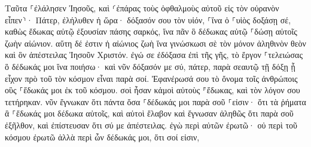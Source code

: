 \documentclass{openreader}
\begin{document}
Ταῦτα ⸀ἐλάλησεν Ἰησοῦς, καὶ ⸂ἐπάρας τοὺς ὀφθαλμοὺς αὐτοῦ εἰς τὸν οὐρανὸν εἶπεν⸃· Πάτερ, ἐλήλυθεν ἡ ὥρα· δόξασόν σου τὸν υἱόν, ⸀ἵνα ὁ ⸀υἱὸς δοξάσῃ σέ, 
καθὼς ἔδωκας αὐτῷ ἐξουσίαν πάσης σαρκός, ἵνα πᾶν ὃ δέδωκας αὐτῷ ⸀δώσῃ αὐτοῖς ζωὴν αἰώνιον. 
αὕτη δέ ἐστιν ἡ αἰώνιος ζωὴ ἵνα γινώσκωσι σὲ τὸν μόνον ἀληθινὸν θεὸν καὶ ὃν ἀπέστειλας Ἰησοῦν Χριστόν. 
ἐγώ σε ἐδόξασα ἐπὶ τῆς γῆς, τὸ ἔργον ⸀τελειώσας ὃ δέδωκάς μοι ἵνα ποιήσω· 
καὶ νῦν δόξασόν με σύ, πάτερ, παρὰ σεαυτῷ τῇ δόξῃ ᾗ εἶχον πρὸ τοῦ τὸν κόσμον εἶναι παρὰ σοί. 
Ἐφανέρωσά σου τὸ ὄνομα τοῖς ἀνθρώποις οὓς ⸀ἔδωκάς μοι ἐκ τοῦ κόσμου. σοὶ ἦσαν κἀμοὶ αὐτοὺς ⸁ἔδωκας, καὶ τὸν λόγον σου τετήρηκαν. 
νῦν ἔγνωκαν ὅτι πάντα ὅσα ⸀δέδωκάς μοι παρὰ σοῦ ⸀εἰσιν· 
ὅτι τὰ ῥήματα ἃ ⸀ἔδωκάς μοι δέδωκα αὐτοῖς, καὶ αὐτοὶ ἔλαβον καὶ ἔγνωσαν ἀληθῶς ὅτι παρὰ σοῦ ἐξῆλθον, καὶ ἐπίστευσαν ὅτι σύ με ἀπέστειλας. 
ἐγὼ περὶ αὐτῶν ἐρωτῶ· οὐ περὶ τοῦ κόσμου ἐρωτῶ ἀλλὰ περὶ ὧν δέδωκάς μοι, ὅτι σοί εἰσιν, 
\end{document}
